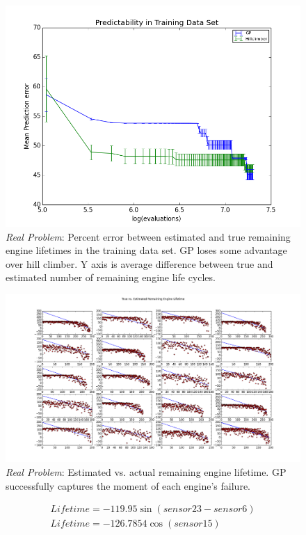 \documentclass{acm_proc_article-sp}
\begin{document}
\begin{figure}[!h]
\center
\includegraphics[scale=0.45]{bigplot_2k.png}
\caption{{\it{Real Problem}}: Percent error between estimated and true remaining engine lifetimes in the training data set. GP loses some advantage over hill climber. Y axis is average difference between true and estimated number of remaining engine life cycles.}
\end{figure}

\begin{figure}[t!]
\center
\includegraphics[scale=0.4]{first_20.png}
\caption{{\it{Real Problem}}: Estimated vs. actual remaining engine lifetime. GP successfully captures the moment of each engine's failure.}
\end{figure}


\begin{eqnarray}
Lifetime = -119.95\sin{(sensor23 - sensor 6)}
\\
Lifetime = -126.7854\cos{(sensor15)}
\end{eqnarray}
\end{document}
